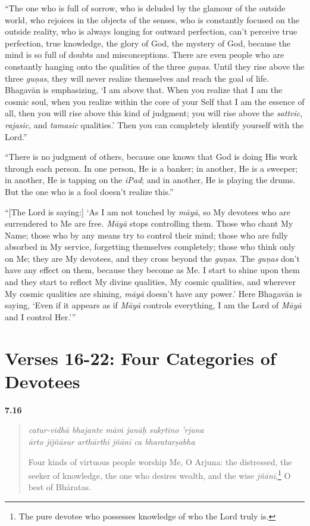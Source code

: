 \enquote{The one who is full of sorrow, who is deluded by the glamour of the outside world, who rejoices in the objects of the senses, who is constantly focused on the outside reality, who is always longing for outward perfection, can’t perceive true perfection, true knowledge, the glory of God, the mystery of God, because the mind is so full of doubts and misconceptions. There are even people who are constantly hanging onto the qualities of the three \textit{guṇas}. Until they rise above the three \textit{guṇas}, they will never realize themselves and reach the goal of life. Bhagavān is emphasizing, \enquote{I am above that. When you realize that I am the cosmic soul, when you realize within the core of your Self that I am the essence of all, then you will rise above this kind of judgment; you will rise above the \textit{sattvic}, \textit{rajasic}, and \textit{tamasic} qualities.} Then you can completely identify yourself with the Lord.}

\enquote{There is no judgment of others, because one knows that God is doing His work through each person. In one person, He is a banker; in another, He is a sweeper; in another, He is tapping on the \textit{iPad}; and in another, He is playing the drums. But the one who is a fool doesn’t realize this.}

\enquote{[The Lord is saying:] \enquote{As I am not touched by \textit{māyā}, so My devotees who are surrendered to Me are free. \textit{Māyā} stops controlling them. Those who chant My Name; those who by any means try to control their mind; those who are fully absorbed in My service, forgetting themselves completely; those who think only on Me; they are My devotees, and they cross beyond the \textit{guṇas}. The \textit{guṇas} don’t have any effect on them, because they become as Me. I start to shine upon them and they start to reflect My divine qualities, My cosmic qualities, and wherever My cosmic qualities are shining, \textit{māyā} doesn’t have any power.} Here Bhagavān is saying, \enquote{Even if it appears as if \textit{Māyā} controls everything, I am the Lord of \textit{Māyā} and I control Her.}}

\section{Verses 16-22: Four Categories of Devotees}\label{sec-verses-16-22-four-categories-of-devotees}


\par\noindent\textbf{7.16}\par
\begin{verse}
\textit{catur-vidhā bhajante māṁ janāḥ sukṛtino ’rjuna} \\
\textit{ārto jijñāsur arthārthī jñānī ca bharatarṣabha}

\noindent Four kinds of virtuous people worship Me, O Arjuna: the distressed, the seeker of knowledge, the one who desires wealth, and the wise \textit{jñānī},\footnote{The pure devotee who possesses knowledge of who the Lord truly is.} O best of Bhāratas.
\end{verse}
\par



